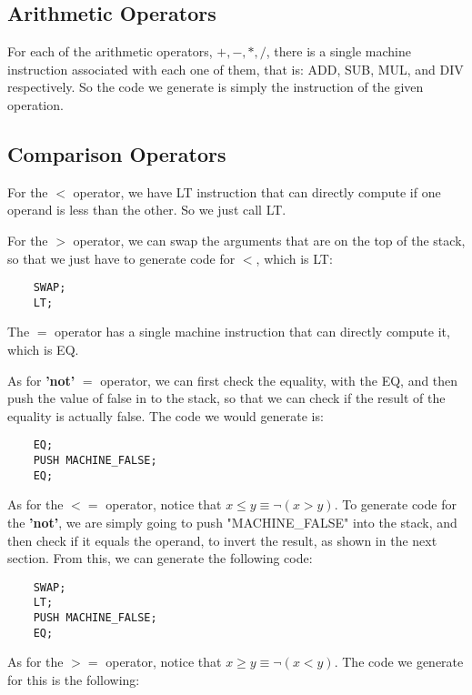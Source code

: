 \documentclass{article}
\begin{document}
\subsection{Arithmetic Operators}

For each of the arithmetic operators, $+,-,*,/$, there is a single machine instruction associated with each one of them, that is: ADD, SUB, MUL, and DIV respectively. So the code we generate is simply the instruction of the given operation.

\subsection{Comparison Operators}

For the $<$ operator, we have LT instruction that can directly compute if one operand is less than the other. So we just call LT.

For the $>$ operator, we can swap the arguments that are on the top of the stack, so that we just have to generate code for $<$, which is LT:

\begin{lstlisting}
    SWAP;
    LT;
\end{lstlisting}

The $=$ operator has a single machine instruction that can directly compute it, which is EQ.

As for \textbf{'not'} $=$ operator, we can first check the equality, with the EQ, and then push the value of false in to the stack, so that we can check if the result of the equality is actually false. The code we would generate is:

\begin{lstlisting}
    EQ;
    PUSH MACHINE_FALSE;
    EQ;
\end{lstlisting}

As for the $<=$ operator, notice that $x \leq y \equiv \lnot(x > y)$. To generate code for the \textbf{'not'}, we are simply going to push 
"MACHINE\_FALSE" into the stack, and then check if it equals the operand, to invert the result, as shown in the next section. From this, we can generate the following code:

\begin{lstlisting}
    SWAP;
    LT;
    PUSH MACHINE_FALSE;
    EQ;
\end{lstlisting}

As for the $>=$ operator, notice that $x \geq y \equiv \lnot(x < y)$. The code we generate for this is the following:
\end{document}
